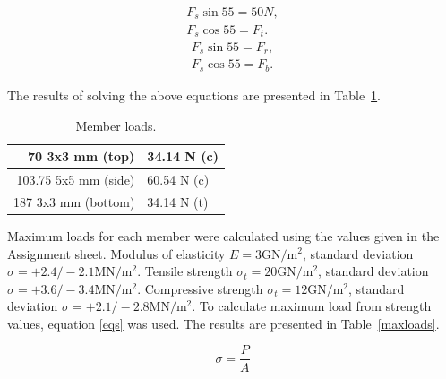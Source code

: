 \documentclass[12pt]{article}
\begin{document}

		\begin{subequations}
			\begin{align}
				F_s \sin 55 = 50 N, \\
				F_s \cos 55 = F_t.
			\end{align} \label{eqn1}
		\end{subequations}
		\begin{subequations}
			\begin{align}
				F_s \sin 55= F_r, \\ 
				F_s \cos 55 = F_b.
			\end{align} \label{eqn2}
		\end{subequations}

		The results of solving the above equations are presented in Table~\ref{loads}.
		

		\begin{table}[h!]
			\caption{Member loads.}
			\begin{center}
			\begin{tabular}{ | r | l | }
				\hline
				70 3x3 mm (top) & 34.14 N (c) \\ \hline
				103.75 5x5 mm (side) & 60.54 N (c) \\ \hline
				187 3x3 mm (bottom) & 34.14 N (t) \\ \hline
			\end{tabular}
			\end{center}
			\label{loads}
		\end{table}



		Maximum loads for each member were calculated using the values given in the Assignment sheet. Modulus of elasticity $E=3\mathrm{GN}/\mathrm{m}^2$, standard deviation $\sigma=+2.4/-2.1\mathrm{MN}/\mathrm{m}^2$. Tensile strength $\sigma_t=20\mathrm{GN}/\mathrm{m}^2$,  standard deviation $\sigma=+3.6/-3.4\mathrm{MN}/\mathrm{m}^2$. Compressive strength $\sigma_t=12\mathrm{GN}/\mathrm{m}^2$,  standard deviation $\sigma=+2.1/-2.8\mathrm{MN}/\mathrm{m}^2$. To calculate maximum load from strength values, equation \ref{eqs} was used. The results are presented in Table~\ref{maxloads}.

		\begin{equation}
			\sigma=\frac{P}{A}
			\label{eqs}
		\end{equation}
\end{document}
